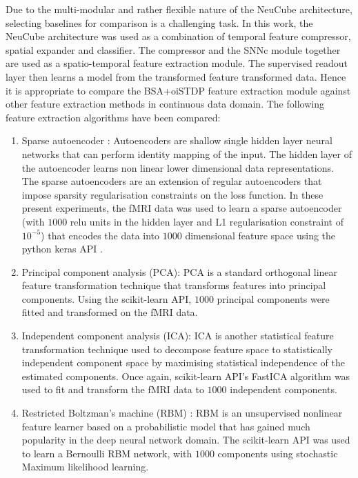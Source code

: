 Due to the multi-modular and rather flexible nature of the NeuCube architecture, selecting baselines for comparison is a challenging task. In this work, the NeuCube architecture was used as a combination of temporal feature compressor, spatial expander and classifier. The compressor and the SNNc module together are used as a spatio-temporal feature extraction module. The supervised readout layer then learns a model from the transformed feature transformed data. Hence it is appropriate to compare the BSA+oiSTDP feature extraction module against other feature extraction methods in continuous data domain. The following feature extraction algorithms have been compared:
\begin{enumerate}
	\item Sparse autoencoder \citep{ng2011sparse}: Autoencoders are shallow single hidden layer neural networks that can perform identity mapping of the input. The hidden layer of the autoencoder learns non linear lower dimensional data representations. The sparse autoencoders are an extension of regular autoencoders that impose sparsity regularisation constraints on the loss function. In these present experiments, the fMRI data was used to learn a sparse autoencoder (with $1000$ relu units in the hidden layer and L1 regularisation constraint of $10^{-5}$) that encodes the data into $1000$ dimensional feature space using the python keras API \citep{chollet2015keras}.   
	\item Principal component analysis (PCA): PCA is a standard orthogonal linear feature transformation technique that transforms features into principal components. Using the scikit-learn API, $1000$ principal components were fitted and transformed on the fMRI data.
	\item Independent component analysis (ICA): ICA is another statistical feature transformation technique used to decompose feature space to statistically independent component space by maximising statistical independence of the estimated components. Once again, scikit-learn \citep{scikit-learn} API's FastICA algorithm was used to fit and transform the fMRI data to $1000$ independent components.  
	\item Restricted Boltzman's machine (RBM) \citep{hinton2006reducing}: RBM is an unsupervised nonlinear feature learner based on a probabilistic model that has gained much popularity in the deep neural network domain. The scikit-learn API \citep{scikit-learn} was used to learn a Bernoulli RBM network, with $1000$ components using stochastic Maximum likelihood \citep{tieleman2008training} learning. 
\end{enumerate}

